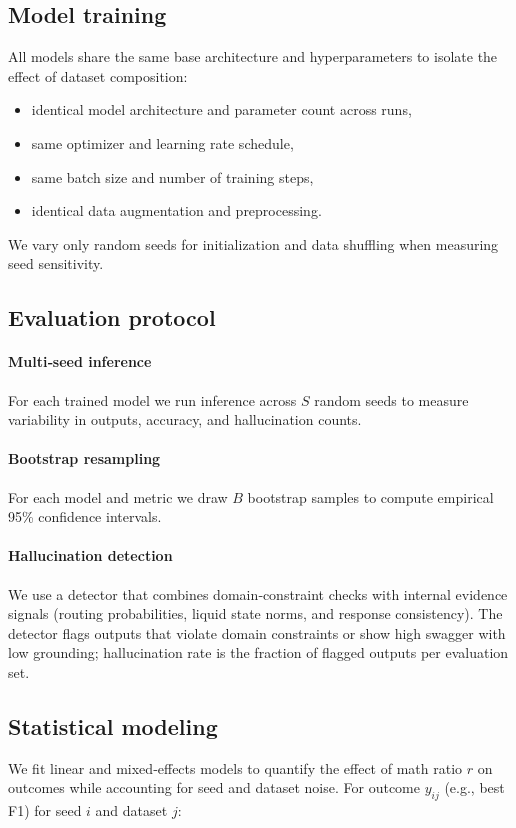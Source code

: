\documentclass[11pt,a4paper]{article}
\begin{document}
\subsection{Model training}
All models share the same base architecture and hyperparameters to isolate the effect of dataset composition:
\begin{itemize}[noitemsep]
  \item identical model architecture and parameter count across runs,
  \item same optimizer and learning rate schedule,
  \item same batch size and number of training steps,
  \item identical data augmentation and preprocessing.
\end{itemize}
We vary only random seeds for initialization and data shuffling when measuring seed sensitivity.

\subsection{Evaluation protocol}
\paragraph{Multi‑seed inference} For each trained model we run inference across \(S\) random seeds to measure variability in outputs, accuracy, and hallucination counts.

\paragraph{Bootstrap resampling} For each model and metric we draw \(B\) bootstrap samples to compute empirical 95\% confidence intervals.

\paragraph{Hallucination detection} We use a detector that combines domain‑constraint checks with internal evidence signals (routing probabilities, liquid state norms, and response consistency). The detector flags outputs that violate domain constraints or show high swagger with low grounding; hallucination rate is the fraction of flagged outputs per evaluation set.

\subsection{Statistical modeling}
We fit linear and mixed‑effects models to quantify the effect of math ratio \(r\) on outcomes while accounting for seed and dataset noise. For outcome \(y_{ij}\) (e.g., best F1) for seed \(i\) and dataset \(j\):
\end{document}
